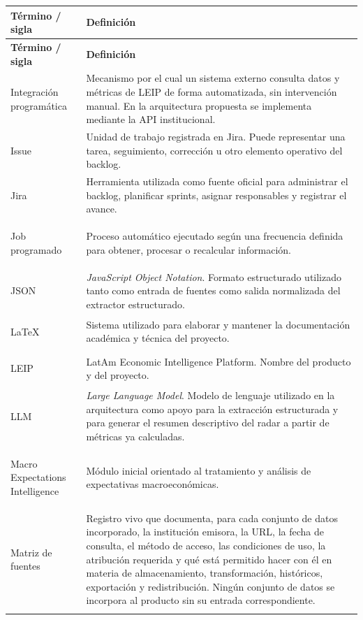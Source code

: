 \documentclass[11pt,a4paper]{article}
\makeatletter
\newcommand{\proyectoNombre}{LEIP}
\newcommand{\proyectoNombreLargo}{LatAm Economic Intelligence Platform}
\newenvironment{glosario}{%
  \renewcommand{\arraystretch}{1.18}%
  \begin{longtable}{@{}>{\raggedright\arraybackslash\bfseries}p{4.0cm} >{\raggedright\arraybackslash}p{10.7cm}@{}}
  \toprule
  \textbf{T\'ermino / sigla} & \textbf{Definici\'on} \\
  \midrule
  \endfirsthead
  \toprule
  \textbf{T\'ermino / sigla} & \textbf{Definici\'on} \\
  \midrule
  \endhead
  \bottomrule
  \endfoot
}{%
  \end{longtable}
  \renewcommand{\arraystretch}{1}%
}
\makeatother
\begin{document}
\begin{glosario}
Integraci\'on program\'atica & Mecanismo por el cual un sistema externo consulta datos y m\'etricas de \proyectoNombre{} de forma automatizada, sin intervenci\'on manual. En la arquitectura propuesta se implementa mediante la API institucional. \\
\addlinespace

Issue & Unidad de trabajo registrada en Jira. Puede representar una tarea, seguimiento, correcci\'on u otro elemento operativo del backlog. \\
\addlinespace

Jira & Herramienta utilizada como fuente oficial para administrar el backlog, planificar sprints, asignar responsables y registrar el avance. \\
\addlinespace

Job programado & Proceso autom\'atico ejecutado seg\'un una frecuencia definida para obtener, procesar o recalcular informaci\'on. \\
\addlinespace

JSON & \emph{JavaScript Object Notation}. Formato estructurado utilizado tanto como entrada de fuentes como salida normalizada del extractor estructurado. \\
\addlinespace

LaTeX & Sistema utilizado para elaborar y mantener la documentaci\'on acad\'emica y t\'ecnica del proyecto. \\
\addlinespace

LEIP & \proyectoNombreLargo. Nombre del producto y del proyecto. \\
\addlinespace

LLM & \emph{Large Language Model}. Modelo de lenguaje utilizado en la arquitectura como apoyo para la extracci\'on estructurada y para generar el resumen descriptivo del radar a partir de m\'etricas ya calculadas. \\
\addlinespace

Macro Expectations Intelligence & M\'odulo inicial orientado al tratamiento y an\'alisis de expectativas macroecon\'omicas. \\
\addlinespace

Matriz de fuentes & Registro vivo que documenta, para cada conjunto de datos incorporado, la instituci\'on emisora, la URL, la fecha de consulta, el m\'etodo de acceso, las condiciones de uso, la atribuci\'on requerida y qu\'e est\'a permitido hacer con \'el en materia de almacenamiento, transformaci\'on, hist\'oricos, exportaci\'on y redistribuci\'on. Ning\'un conjunto de datos se incorpora al producto sin su entrada correspondiente. \\
\addlinespace


\end{glosario}
\end{document}
